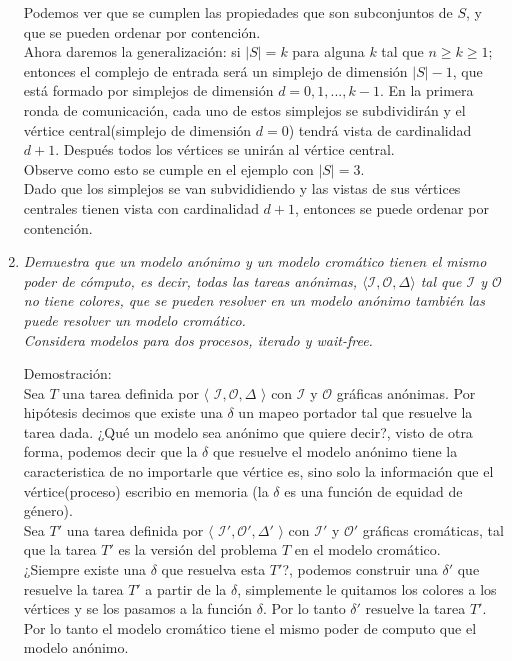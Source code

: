 \documentclass{article}
\begin{document}
\begin{enumerate}
{\begin{center}
    \end{center}
    Podemos ver que se cumplen las propiedades que son subconjuntos de $S$, y que se pueden ordenar por contención.\\
    Ahora daremos la generalización: si $|S| = k$ para alguna $k$ tal que $n ≥ k ≥ 1$; entonces el complejo de entrada
    será un simplejo de dimensión $|S| - 1$, que está formado por simplejos de dimensión $d = 0, 1, ..., k-1$. En la primera
    ronda de comunicación, cada uno de estos simplejos se subdividirán y el vértice central(simplejo de dimensión $d = 0$) tendrá
    vista de cardinalidad $d + 1$. Después todos los vértices se unirán al vértice central.\\
    Observe como esto se cumple en el ejemplo con $|S| = 3$.\\
    Dado que los simplejos se van subvididiendo y las vistas de sus vértices centrales tienen vista con cardinalidad $d + 1$, entonces
    se puede ordenar por contención.
  }
  
\item{
    \textsl{
      Demuestra que un modelo anónimo y un modelo cromático tienen el mismo poder de cómputo, es
      decir, todas las tareas anónimas, $\langle \mathcal{I},\mathcal{O},\Delta \rangle$ tal que
      $\mathcal{I}$ y $\mathcal{O}$ no tiene colores, que se pueden resolver en un modelo anónimo
      también las puede resolver un modelo cromático.\\
      Considera modelos para dos procesos, iterado y wait-free.\\
    }

    Demostración:\\
    Sea $T$ una tarea definida por $\langle$ $\mathcal{I},\mathcal{O},\Delta$ $\rangle$ con $\mathcal{I}$
    y $\mathcal{O}$ gráficas anónimas. Por hipótesis decimos que existe una $\delta$ un mapeo portador
    tal que resuelve la tarea dada.
    ¿Qué un modelo sea anónimo que quiere decir?, visto de otra forma, podemos decir que la $\delta$ que
    resuelve el modelo anónimo tiene la caracteristica de no importarle que vértice es, sino solo la 
    información que el vértice(proceso) escribio en memoria (la $\delta$ es una función de equidad de género).\\
    Sea $T'$ una tarea definida por $\langle$ $\mathcal{I}',\mathcal{O}',\Delta'$ $\rangle$ con $\mathcal{I}'$
    y $\mathcal{O}'$ gráficas cromáticas, tal que la tarea $T'$ es la versión del problema $T$ en el modelo 
    cromático.\\
    ¿Siempre existe una $\delta$ que resuelva esta $T'$?, podemos construir una $\delta'$ que resuelve la tarea $T'$
    a partir de la $\delta$, simplemente le quitamos los colores a los vértices y se los pasamos a la función $\delta$.
    Por lo tanto $\delta'$ resuelve la tarea $T'$.\\
    Por lo tanto el modelo cromático tiene el mismo poder de computo que el modelo anónimo.
    
  }
\end{enumerate}
\end{document}
